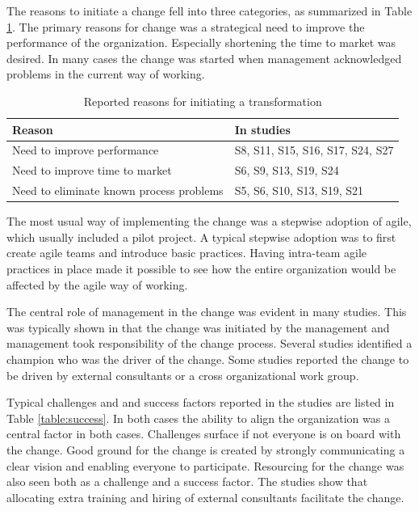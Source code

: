 \documentclass[lnbip]{svmultln}
\begin{document}
The reasons to initiate a change fell into three categories, as summarized in
Table \ref{table:motivations}. The primary reasons for change was a strategical
need to improve the performance of the organization. Especially shortening the
time to market was desired. In many cases the change was started when management
acknowledged problems in the current way of working.

\begin{table}[t]
    \begin{tabular}{ l@{ \hskip 0.4cm } l }
        \toprule
        Reason                                    & In studies   \\ \midrule
        Need to improve performance               & S8, S11, S15, S16, S17, S24, S27 \\ 
        Need to improve time to market            & S6, S9, S13, S19, S24 \\
        Need to eliminate known process problems  & S5, S6, S10, S13, S19, S21 \\
        \bottomrule
    \end{tabular}
    \caption{Reported reasons for initiating a transformation}
    \label{table:motivations}
\end{table}


The most usual way of implementing the change was a stepwise adoption of agile,
which usually included a pilot project. A typical stepwise adoption was to first
create agile teams and introduce basic practices. Having intra-team agile
practices in place made it possible to see how the entire organization would be
affected by the agile way of working.

The central role of management in the change was evident in many studies. This
was typically shown in that the change was initiated by the management and
management took responsibility of the change process. Several studies identified
a champion who was the driver of the change. Some studies reported the change to
be driven by external consultants or a cross organizational work group.

Typical challenges and and success factors reported in the studies are listed in
Table \ref{table:success}. In both cases the ability to align the organization
was a central factor in both cases. Challenges surface if not everyone is on
board with the change. Good ground for the change is created by strongly
communicating a clear vision and enabling everyone to participate. Resourcing
for the change was also seen both as a challenge and a success factor.
The studies show that allocating extra training and hiring of external consultants
facilitate the change.
\end{document}
